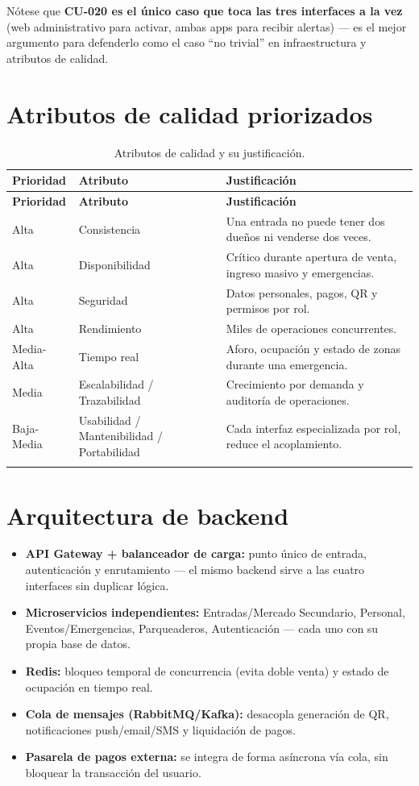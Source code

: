 \documentclass[12pt,a4paper]{article}
\begin{document}
Nótese que \textbf{CU-020 es el único caso que toca las tres interfaces a la vez} (web
administrativo para activar, ambas apps para recibir alertas) --- es el mejor argumento para
defenderlo como el caso ``no trivial'' en infraestructura y atributos de calidad.

\section{Atributos de calidad priorizados}

\begin{longtable}{p{2.2cm}p{3cm}p{8.5cm}}
\toprule
\textbf{Prioridad} & \textbf{Atributo} & \textbf{Justificación}\\
\midrule
\endfirsthead
\toprule
\textbf{Prioridad} & \textbf{Atributo} & \textbf{Justificación}\\
\midrule
\endhead
Alta & Consistencia & Una entrada no puede tener dos dueños ni venderse dos veces.\\
Alta & Disponibilidad & Crítico durante apertura de venta, ingreso masivo y emergencias.\\
Alta & Seguridad & Datos personales, pagos, QR y permisos por rol.\\
Alta & Rendimiento & Miles de operaciones concurrentes.\\
Media-Alta & Tiempo real & Aforo, ocupación y estado de zonas durante una emergencia.\\
Media & Escalabilidad / Trazabilidad & Crecimiento por demanda y auditoría de operaciones.\\
Baja-Media & Usabilidad / Mantenibilidad / Portabilidad & Cada interfaz especializada por rol,
reduce el acoplamiento.\\
\bottomrule
\caption{Atributos de calidad y su justificación.}
\end{longtable}

\section{Arquitectura de backend}

\begin{itemize}
\item \textbf{API Gateway + balanceador de carga:} punto único de entrada, autenticación y
enrutamiento --- el mismo backend sirve a las cuatro interfaces sin duplicar lógica.
\item \textbf{Microservicios independientes:} Entradas/Mercado Secundario, Personal,
Eventos/Emergencias, Parqueaderos, Autenticación --- cada uno con su propia base de datos.
\item \textbf{Redis:} bloqueo temporal de concurrencia (evita doble venta) y estado de ocupación
en tiempo real.
\item \textbf{Cola de mensajes (RabbitMQ/Kafka):} desacopla generación de QR, notificaciones
push/email/SMS y liquidación de pagos.
\item \textbf{Pasarela de pagos externa:} se integra de forma asíncrona vía cola, sin bloquear la
transacción del usuario.
\end{itemize}
\end{document}
